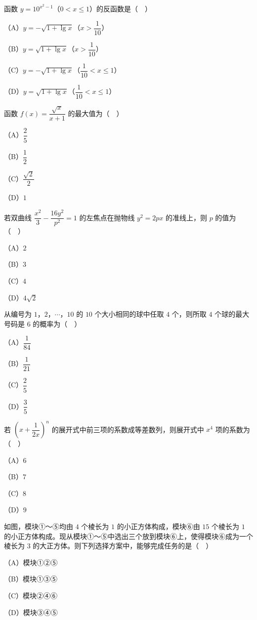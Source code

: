 \begin{question}
函数 $y=10^{x^2-1}$（$0<x\leqslant1$）的反函数是（　）

（A）$y=-\sqrt{1+\lg x}$（$x>\dfrac1{10}$）

（B）$y=\sqrt{1+\lg x}$（$x>\dfrac1{10}$）

（C）$y=-\sqrt{1+\lg x}$（$\dfrac1{10}<x\leqslant1$）

（D）$y=\sqrt{1+\lg x}$（$\dfrac1{10}<x\leqslant1$）

\end{question}
\begin{question}
函数 $f(x)=\dfrac{\sqrt x}{x+1}$ 的最大值为（　）

（A）$\dfrac25$

（B）$\dfrac12$

（C）$\dfrac{\sqrt2}2$

（D）$1$

\end{question}
\begin{question}
若双曲线 $\dfrac{x^2}3-\dfrac{16y^2}{p^2}=1$ 的左焦点在抛物线 $y^2=2px$ 的准线上，则 $p$ 的值为（　）

（A）$2$

（B）$3$

（C）$4$

（D）$4\sqrt2$

\end{question}
\begin{question}
从编号为 $1$，$2$，$\cdots$，$10$ 的 $10$ 个大小相同的球中任取 $4$ 个，则所取 $4$ 个球的最大号码是 $6$ 的概率为（　）

（A）$\dfrac1{84}$

（B）$\dfrac1{21}$

（C）$\dfrac25$

（D）$\dfrac35$

\end{question}
\begin{question}
若 $\left(x+\dfrac1{2x}\right)^n$ 的展开式中前三项的系数成等差数列，则展开式中 $x^4$ 项的系数为（　）

（A）$6$

（B）$7$

（C）$8$

（D）$9$

\Needspace{0.4\textheight}
\end{question}
\begin{question}
如图，模块①～⑤均由 $4$ 个棱长为 $1$ 的小正方体构成，模块⑥由 $15$ 个棱长为 $1$ 的小正方体构成。现从模块①～⑤中选出三个放到模块⑥上，使得模块⑥成为一个棱长为 $3$ 的大正方体。则下列选择方案中，能够完成任务的是（　）
\nopagebreak[4]
\begin{center}\end{center}
\nopagebreak[4]
（A）模块①②⑤

（B）模块①③⑤

（C）模块②④⑥

（D）模块③④⑤

\end{question}
